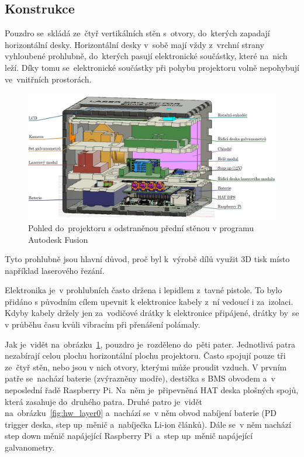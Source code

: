 \subsection{Konstrukce}
Pouzdro se~skládá ze~čtyř vertikálních stěn s~otvory, do~kterých zapadají horizontální desky. Horizontální desky v~sobě mají vždy z~vrchní strany vyhloubené prohlubně, do~kterých pasují elektronické součástky, které na~nich leží. Díky tomu se~elektronické součástky při pohybu projektoru volně nepohybují ve~vnitřních prostorách.

\begin{figure}[htb]
  \centering
  \includegraphics[width=1\textwidth]{img/case-sideview.jpg}
  \caption{\label{fig:case-sideview} Pohled do~projektoru s odstraněnou přední stěnou v programu Autodesk Fusion}
\end{figure}

Tyto prohlubně jsou hlavní důvod, proč byl k~výrobě dílů využit 3D tisk místo například laserového řezání.

Elektronika je~v prohlubních často držena i lepidlem z~tavné pistole.
To bylo přidáno s původním cílem upevnit k elektronice kabely z~ní vedoucí i za~izolaci. Kdyby kabely držely jen za~vodičové drátky k elektronice připájené, drátky by~se v průběhu času kvůli vibracím při přenášení polámaly.

Jak je~vidět na~obrázku~\ref{fig:case-sideview}, pouzdro je~rozděleno do~pěti pater. Jednotlivá patra nezabírají celou plochu horizontální plochu projektoru. Často spojují pouze tři ze~čtyř stěn, nebo jsou v nich otvory, kterými může proudit vzduch. V prvním patře se~nachází baterie (zvýrazněny modře), destička s BMS obvodem a~v neposlední řadě Raspberry Pi. Na~něm je~připevněná HAT deska plošných spojů, která zasahuje do~druhého patra. Druhé patro je~vidět na~obrázku~\ref{fig:hw_layer0} a~nachází se~v něm obvod nabíjení baterie (PD trigger deska, step up~měnič a~nabíječka Li-ion článků).
Dále se~v něm nachází step down měnič napájející Raspberry Pi~a~step up~měnič napájející galvanometry.

